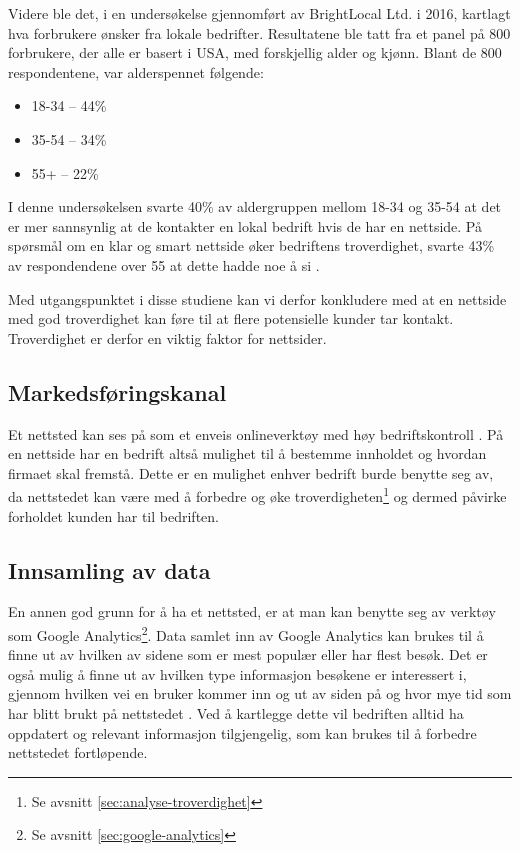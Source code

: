 
Videre ble det, i en undersøkelse gjennomført av BrightLocal Ltd. i 2016, kartlagt hva forbrukere ønsker fra lokale bedrifter. Resultatene ble tatt fra et panel på 800 forbrukere, der alle er basert i USA, med forskjellig alder og kjønn. Blant de 800 respondentene, var alderspennet følgende: 

\begin{itemize}
\item 18-34 – 44\%
\item 35-54 – 34\%
\item 55+ – 22\%
\end{itemize}

I denne undersøkelsen svarte 40\% av aldergruppen mellom 18-34 og 35-54 at det er mer sannsynlig at de kontakter en lokal bedrift hvis de har en nettside. På spørsmål om en klar og smart nettside øker bedriftens troverdighet, svarte 43\% av respondendene over 55 at dette hadde noe å si \cite{marchant18wdc}.

Med utgangspunktet i disse studiene kan vi derfor konkludere med at en nettside med god troverdighet kan føre til at flere potensielle kunder tar kontakt. Troverdighet er derfor en viktig faktor for nettsider.

\subsection{Markedsføringskanal}
Et nettsted kan ses på som et enveis onlineverktøy med høy bedriftskontroll \cite{taiminen2015tuo}. På en nettside har en bedrift altså mulighet til å bestemme innholdet og hvordan firmaet skal fremstå. Dette er en mulighet enhver bedrift burde benytte seg av, da nettstedet kan være med å forbedre og øke troverdigheten\footnote{Se avsnitt \ref{sec:analyse-troverdighet}} og dermed påvirke forholdet kunden har til bedriften.

\subsection{Innsamling av data}
En annen god grunn for å ha et nettsted, er at man kan benytte seg av verktøy som Google Analytics\footnote{Se avsnitt \ref{sec:google-analytics}}. Data samlet inn av Google Analytics kan brukes til å finne ut av hvilken av sidene som er mest populær eller har flest besøk. Det er også mulig å finne ut av hvilken type informasjon besøkene er interessert i, gjennom hvilken vei en bruker kommer inn og ut av siden på og hvor mye tid som har blitt brukt på nettstedet \cite{kent2011lwa}. Ved å kartlegge dette vil bedriften alltid ha oppdatert og relevant informasjon tilgjengelig, som kan brukes til å forbedre nettstedet fortløpende. 

